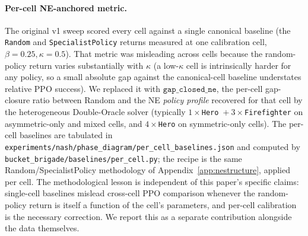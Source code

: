 \documentclass{anvil-paper}
\begin{document}
\paragraph{Per-cell NE-anchored metric.}
The original v1 sweep scored every cell against a single canonical baseline
(the \texttt{Random} and \texttt{SpecialistPolicy} returns measured at one
calibration cell, $\beta{=}0.25,\kappa{=}0.5$). That metric was misleading
across cells because the random-policy return varies substantially with
$\kappa$ (a low-$\kappa$ cell is intrinsically harder for any policy, so a
small absolute gap against the canonical-cell baseline understates relative
PPO success). We replaced it with $\texttt{gap\_closed\_ne}$, the per-cell
gap-closure ratio between Random and the NE \emph{policy profile}
recovered for that cell by the heterogeneous Double-Oracle solver
(typically $1\times$\texttt{Hero}~$+~3\times$\texttt{Firefighter} on
asymmetric-only and mixed cells, and $4\times$\texttt{Hero} on
symmetric-only cells). The per-cell baselines are tabulated in
\texttt{experiments/nash/phase\_diagram/per\_cell\_baselines.json} and
computed by \texttt{bucket\_brigade/baselines/per\_cell.py}; the recipe is
the same Random/SpecialistPolicy methodology of Appendix~\ref{app:nestructure},
applied per cell. The methodological lesson is independent of this paper's
specific claims: single-cell baselines mislead cross-cell PPO comparison
whenever the random-policy return is itself a function of the cell's
parameters, and per-cell calibration is the necessary correction. We report
this as a separate contribution alongside the data themselves.
\end{document}
